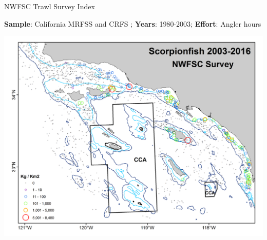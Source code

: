 \documentclass[ignorenonframetext,]{beamer}
\begin{document}
\begin{frame}{NWFSC Trawl Survey Index}

\textbf{Sample}: California MRFSS and CRFS ; \textbf{Years}: 1980-2003;
\textbf{Effort}: Angler hours

\includegraphics[height=.7\textheight]{Figures/NWFSCtrawl_map.png}

\end{frame}
\end{document}
